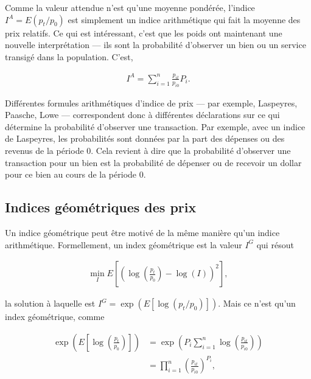 \documentclass[]{article}
\begin{document}
Comme la valeur attendue n'est qu'une moyenne pondérée, l'indice \(I^{A} = E(p_{t} / p_{0})\) est simplement un indice arithmétique qui fait la moyenne des prix relatifs. Ce qui est intéressant, c'est que les poids ont maintenant une nouvelle interprétation --- ils sont la probabilité d'observer un bien ou un service transigé dans la population. C'est,

\begin{align*}
I^{A} = \sum_{i = 1}^{n} \frac{p_{it}}{p_{i0}} P_{i}.
\end{align*}

Différentes formules arithmétiques d'indice de prix --- par exemple, Laspeyres, Paasche, Lowe --- correspondent donc à différentes déclarations sur ce qui détermine la probabilité d'observer une transaction. Par exemple, avec un indice de Laspeyres, les probabilités sont données par la part des dépenses ou des revenus de la période 0. Cela revient à dire que la probabilité d'observer une transaction pour un bien est la probabilité de dépenser ou de recevoir un dollar pour ce bien au cours de la période 0.

\hypertarget{indices-guxe9omuxe9triques-des-prix-1}{%
\subsection{Indices géométriques des prix}\label{indices-guxe9omuxe9triques-des-prix-1}}

Un indice géométrique peut être motivé de la même manière qu'un indice arithmétique. Formellement, un index géométrique est la valeur \(I^{G}\) qui résout

\begin{align*}
\min_{I} E\left[\left(\log\left(\frac{p_{t}} {p_{0}} \right) - \log(I) \right)^{2} \right] ,
\end{align*}

la solution à laquelle est \(I^{G} = \exp(E[\log (p_{t} / p_{0})])\). Mais ce n'est qu'un index géométrique, comme

\begin{align*}
\exp\left(E\left[\log \left(\frac{p_{t}} {p_{0}} \right) \right] \right) & = \exp \left(P_{i} \sum_{i = 1}^{n} \log \left(\frac{p_{it}} {p_{i0}} \right) \right) \\
&= \prod_{i = 1}^{n} \left(\frac{p_{it}}{p_{i0}} \right)^{P_{i}},
\end{align*}
\end{document}
